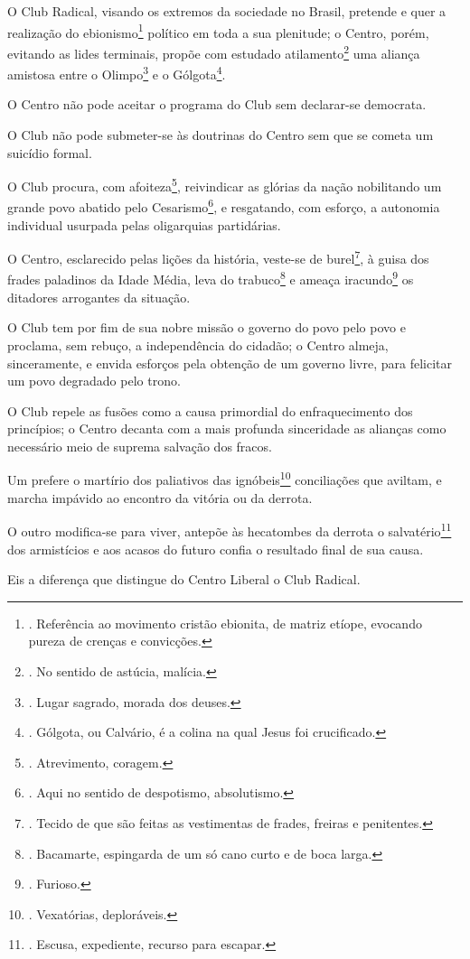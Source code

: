 O Club Radical, visando os extremos da sociedade no Brasil, pretende e
quer a realização do ebionismo\footnote{. Referência ao movimento
  cristão ebionita, de matriz etíope, evocando pureza de crenças e
  convicções.} político em toda a sua plenitude; o Centro, porém,
evitando as lides terminais, propõe com estudado atilamento\footnote{.
  No sentido de astúcia, malícia.} uma aliança amistosa entre o
Olimpo\footnote{. Lugar sagrado, morada dos deuses.} e o
Gólgota\footnote{. Gólgota, ou Calvário, é a colina na qual Jesus foi
  crucificado.}.

O Centro não pode aceitar o programa do Club sem declarar-se democrata.

O Club não pode submeter-se às doutrinas do Centro sem que se cometa um
suicídio formal.

O Club procura, com afoiteza\footnote{. Atrevimento, coragem.},
reivindicar as glórias da nação nobilitando um grande povo abatido pelo
Cesarismo\footnote{. Aqui no sentido de despotismo, absolutismo.}, e
resgatando, com esforço, a autonomia individual usurpada pelas
oligarquias partidárias.

O Centro, esclarecido pelas lições da história, veste-se de
burel\footnote{. Tecido de que são feitas as vestimentas de frades,
  freiras e penitentes.}, à guisa dos frades paladinos da Idade Média,
leva do trabuco\footnote{. Bacamarte, espingarda de um só cano curto e
  de boca larga.} e ameaça iracundo\footnote{. Furioso.} os ditadores
arrogantes da situação.

O Club tem por fim de sua nobre missão o governo do povo pelo povo e
proclama, sem rebuço, a independência do cidadão; o Centro almeja,
sinceramente, e envida esforços pela obtenção de um governo livre, para
felicitar um povo degradado pelo trono.

O Club repele as fusões como a causa primordial do enfraquecimento dos
princípios; o Centro decanta com a mais profunda sinceridade as alianças
como necessário meio de suprema salvação dos fracos.

Um prefere o martírio dos paliativos das ignóbeis\footnote{. Vexatórias,
  deploráveis.} conciliações que aviltam, e marcha impávido ao encontro
da vitória ou da derrota.

O outro modifica-se para viver, antepõe às hecatombes da derrota o
salvatério\footnote{. Escusa, expediente, recurso para escapar.} dos
armistícios e aos acasos do futuro confia o resultado final de sua
causa.

Eis a diferença que distingue do Centro Liberal o Club Radical.

